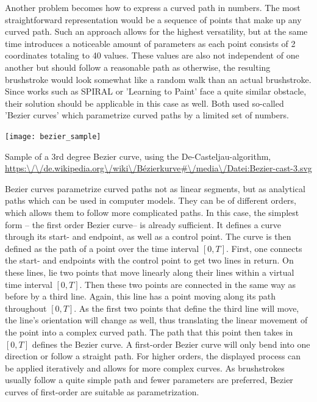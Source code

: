 Another problem becomes how to express a curved path in numbers.
The most straightforward representation would be a sequence of points that make up any curved path.
Such an approach allows for the highest versatility, but at the same time introduces a noticeable amount of parameters as each point consists of 2 coordinates totaling to 40 values.
These values are also not independent of one another but should follow a reasonable path as otherwise, the resulting brushstroke would look somewhat like a random walk than an actual brushstroke.
Since works such as SPIRAL or 'Learning to Paint' face a quite similar obstacle, their solution should be applicable in this case as well.
Both used so-called 'Bezier curves' which parametrize curved paths by a limited set of numbers.
\begin{marginfigure}
    \texttt{[image: bezier\_sample]}
    \caption[]{Sample of a 3rd degree Bezier curve, using the De-Casteljau-algorithm,
    \url{https:\/\/de.wikipedia.org\/wiki\/Bézierkurve\#\/media\/Datei:Bezier-cast-3.svg}}
\end{marginfigure}

Bezier curves parametrize curved paths not as linear segments, but as analytical paths which can be used in computer models.
They can be of different orders, which allows them to follow more complicated paths.
In this case, the simplest form -- the first order Bezier curve-- is already sufficient.
It defines a curve through its start- and endpoint, as well as a control point.
The curve is then defined as the path of a point over the time interval $[0, T]$.
First, one connects the start- and endpoints with the control point to get two lines in return.
On these lines, lie two points that move linearly along their lines within a virtual time interval $[0, T]$.
Then these two points are connected in the same way as before by a third line.
Again, this line has a point moving along its path throughout $[0, T]$.
As the first two points that define the third line will move, the line's orientation will change as well, thus translating the linear movement of the point into a complex curved path.
The path that this point then takes in $[0, T]$ defines the Bezier curve.
A first-order Bezier curve will only bend into one direction or follow a straight path.
For higher orders, the displayed process can be applied iteratively and allows for more complex curves.
As brushstrokes usually follow a quite simple path and fewer parameters are preferred, Bezier curves of first-order are suitable as parametrization.

